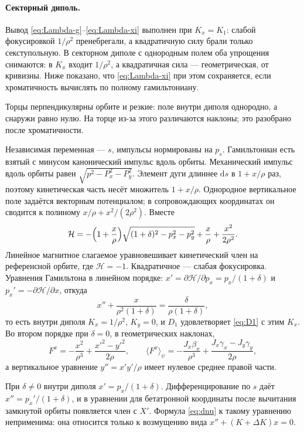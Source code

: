 \paragraph{Секторный диполь.}
Вывод \eqref{eq:Lambda-g}--\eqref{eq:Lambda-xi} выполнен при $K_x=K_1$: слабой фокусировкой $1/\rho^2$ пренебрегали, а квадратичную силу брали только секступольную. В секторном диполе с однородным полем оба упрощения снимаются: в $K_x$ входит $1/\rho^2$, а квадратичная сила --- геометрическая, от кривизны. Ниже показано, что \eqref{eq:Lambda-xi} при этом сохраняется, если хроматичность вычислять по полному гамильтониану.

Торцы перпендикулярны орбите и резкие: поле внутри диполя однородно, а снаружи равно нулю. На торце из-за этого различаются наклоны; это разобрано после хроматичности.

Независимая переменная --- $s$, импульсы нормированы на $p_s$. Гамильтониан есть взятый с минусом канонический импульс вдоль орбиты. Механический импульс вдоль орбиты равен $\sqrt{p^2-P_x^2-P_y^2}$. Элемент дуги длиннее $\mathrm{d}s$ в $1+x/\rho$ раз, поэтому кинетическая часть несёт множитель $1+x/\rho$. Однородное вертикальное поле задаётся векторным потенциалом; в сопровождающих координатах он сводится к полиному $x/\rho+x^2/(2\rho^2)$. Вместе
\begin{equation}
\label{eq:h-sector}
\mathcal{H}=-\Bigl(1+\frac{x}{\rho}\Bigr)\sqrt{(1+\delta)^2-p_x^2-p_y^2}
+\frac{x}{\rho}+\frac{x^2}{2\rho^2}.
\end{equation}
Линейное магнитное слагаемое уравновешивает кинетический член на референсной орбите, где $\mathcal{H}=-1$. Квадратичное --- слабая фокусировка. Уравнения Гамильтона в линейном порядке: $x'=\partial\mathcal{H}/\partial p_x=p_x/(1+\delta)$ и $p_x'=-\partial\mathcal{H}/\partial x$, откуда
\begin{equation}
\label{eq:hill-sector}
x''+\frac{x}{\rho^2(1+\delta)}=\frac{\delta}{\rho(1+\delta)},
\end{equation}
то есть внутри диполя $K_x=1/\rho^2$, $K_y=0$, и $D_1$ удовлетворяет \eqref{eq:D1} с этим $K_x$. Во втором порядке при $\delta=0$, в геометрических наклонах,
\begin{equation}
\label{eq:F-sector}
F^x=-\frac{x^2}{\rho^3}+\frac{x'^2-y'^2}{2\rho},
\qquad
\langle F^x\rangle_\psi
=-\frac{J_x\beta_x}{\rho^3}
+\frac{J_x\gamma_x-J_y\gamma_y}{2\rho},
\end{equation}
а вертикальное уравнение $y''=x'y'/\rho$ имеет нулевое среднее правой части.

При $\delta\neq 0$ внутри диполя $x'=p_x/(1+\delta)$. Дифференцирование по $s$ даёт $x''=p_x'/(1+\delta)$, и в уравнении для бетатронной координаты после вычитания замкнутой орбиты появляется член с $X'$. Формула \eqref{eq:dnu} к такому уравнению неприменима: она относится только к возмущению вида $x''+(K+\Delta K)x=0$.

